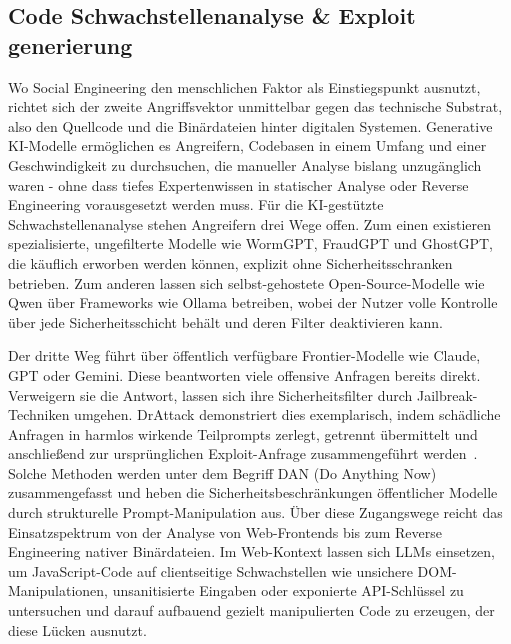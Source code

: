 \subsection{Code Schwachstellenanalyse \& Exploit generierung}
\label{sub:Code_Analyse}
Wo Social Engineering den menschlichen Faktor als Einstiegspunkt ausnutzt, richtet sich der zweite Angriffsvektor unmittelbar gegen das technische Substrat, also den Quellcode und die Binärdateien hinter digitalen Systemen. Generative KI-Modelle ermöglichen es Angreifern, Codebasen in einem Umfang und einer Geschwindigkeit zu durchsuchen, die manueller Analyse bislang unzugänglich waren - ohne dass tiefes Expertenwissen in statischer Analyse oder Reverse Engineering vorausgesetzt werden muss.
\newline
\newline
Für die KI-gestützte Schwachstellenanalyse stehen Angreifern drei Wege offen. Zum einen existieren spezialisierte, ungefilterte Modelle wie WormGPT, FraudGPT und GhostGPT, die käuflich erworben werden können, explizit ohne Sicherheitsschranken betrieben. Zum anderen lassen sich selbst-gehostete Open-Source-Modelle wie Qwen über Frameworks wie Ollama betreiben, wobei der Nutzer volle Kontrolle über jede Sicherheitsschicht behält und deren Filter deaktivieren kann.
\newline

Der dritte Weg führt über öffentlich verfügbare Frontier-Modelle wie Claude, GPT oder Gemini. Diese beantworten viele offensive Anfragen bereits direkt. Verweigern sie die Antwort, lassen sich ihre Sicherheitsfilter durch Jailbreak-Techniken umgehen. DrAttack demonstriert dies exemplarisch, indem schädliche Anfragen in harmlos wirkende Teilprompts zerlegt, getrennt übermittelt und anschließend zur ursprünglichen Exploit-Anfrage zusammengeführt werden~\cite{li_drattack_2024}. Solche Methoden werden unter dem Begriff DAN (Do Anything Now) zusammengefasst und heben die Sicherheitsbeschränkungen öffentlicher Modelle durch strukturelle Prompt-Manipulation aus.
\newline
\newline
Über diese Zugangswege reicht das Einsatzspektrum von der Analyse von Web-Frontends bis zum Reverse Engineering nativer Binärdateien. Im Web-Kontext lassen sich LLMs einsetzen, um JavaScript-Code auf clientseitige Schwachstellen wie unsichere DOM-Manipulationen, unsanitisierte Eingaben oder exponierte API-Schlüssel zu untersuchen und darauf aufbauend gezielt manipulierten Code zu erzeugen, der diese Lücken ausnutzt.
\newline


